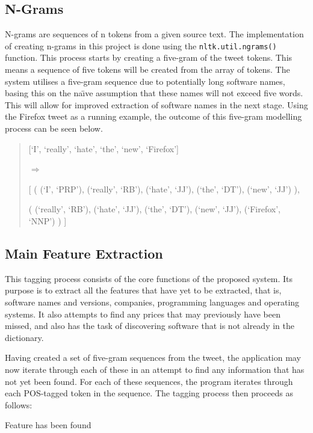 \subsection{N-Grams}
N-grams are sequences of n tokens from a given source text. The implementation of creating n-grams in this project is done using the \texttt{nltk.util.ngrams()} function. This process starts by creating a five-gram of the tweet tokens. This means a sequence of five tokens will be created from the array of tokens. The system utilises a five-gram sequence due to potentially long software names, basing this on the na\"{\i}ve assumption that these names will not exceed five words. This will allow for improved extraction of software names in the next stage. Using the Firefox tweet as a running example, the outcome of this five-gram modelling process can be seen below.

\begin{quote}
[`I', `really', `hate', `the', `new', `Firefox']

\begin{math}\Rightarrow\end{math}

[
 ( (`I', `PRP'), (`really', `RB'), (`hate', `JJ'), (`the', `DT'), (`new', `JJ') ),

 ( (`really', `RB'), (`hate', `JJ'), (`the', `DT'), (`new', `JJ'), (`Firefox', `NNP') )
]
\end{quote}

\subsection{Main Feature Extraction}
This tagging process consists of the core functions of the proposed system. Its purpose is to extract all the features that have yet to be extracted, that is, software names and versions, companies, programming languages and operating systems. It also attempts to find any prices that may previously have been missed, and also has the task of discovering software that is not already in the dictionary.

Having created a set of five-gram sequences from the tweet, the application may now iterate through each of these in an attempt to find any information that has not yet been found. For each of these sequences, the program iterates through each POS-tagged token in the sequence. The tagging process then proceeds as follows: 
\newline
\begin{algorithmic}
            \State Feature has been found
        \EndIf
    \EndIf
\EndIf
\end{algorithmic}


